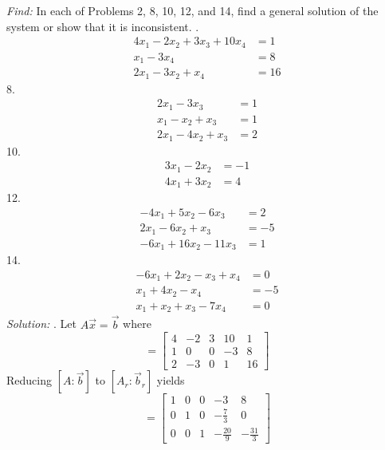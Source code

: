 \documentclass[11pt]{homework}
\begin{document}
\maketitle

\emph{Find:}
\newline
In each of Problems 2, 8, 10, 12, and 14, 
find a general solution of the system
or
show that it is inconsistent.
.
\begin{align*}
4 x_1 - 2 x_2 + 3 x_3 + 10 x_4 &= 1 \\
x_1 - 3 x_4 &= 8 \\
2x_1 - 3 x_2 + x_4 &= 16
\end{align*}
8. 
\begin{align*}
2 x_1 - 3 x_3 &= 1 \\
x_1 - x_2 + x_3 &= 1 \\
2 x_1 - 4 x_2 +x_3 &= 2 
\end{align*}
10.
\begin{align*}
3x_1 - 2 x_2 &= -1 \\
4x_1 + 3x_2 &= 4
\end{align*}
12. 
\begin{align*}
-4 x_1 + 5 x_2 - 6 x_3 &= 2 \\
2 x_1 - 6 x_2 +x_3 &= -5 \\
-6 x_1 + 16 x_2 - 11 x_3 &= 1
\end{align*}
14.
\begin{align*}
-6 x_1 + 2 x_2 - x_3 + x_4 &= 0 \\
x_1 + 4 x_2 -x_4 &= -5 \\
x_1 + x_2 + x_3 - 7 x_4 &= 0
\end{align*}
\newpage
\emph{Solution:}
\newline
{}. Let $ A \vec x = \vec b$ where
\begin{equation*}
  [A: \vec b] = 
  \left[
  \begin{array}{cccc|c}
  4 & -2 & 3 & 10 & 1 \\
  1 & 0 &  0 & -3 & 8 \\
  2 & -3 & 0 & 1  & 16
  \end{array}
  \right]
\end{equation*}
Reducing $[A: \vec b]$ to $[A_r: \vec b_r]$ yields
\begin{equation*}
  [A_r: \vec b_r] = 
  \left[
  \begin{array}{cccc|c}
  1 & 0 & 0 & -3            & 8 \\
  0 & 1 & 0 & -\frac{7}{3}  & 0 \\
  0 & 0 & 1 & -\frac{20}{9} & -\frac{31}{3}
  \end{array}
  \right]
\end{equation*}
\end{document}
